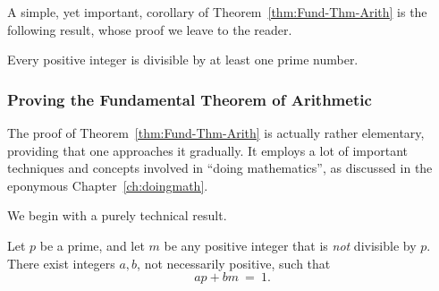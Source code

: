 A simple, yet important, corollary of Theorem~\ref{thm:Fund-Thm-Arith}
is the following result, whose proof we leave to the reader.

\begin{prop}
\label{thm:prime-divisor}
Every positive integer is divisible by at least one prime number.
\end{prop}


\subsubsection{Proving the Fundamental Theorem of Arithmetic}

The  proof of Theorem~\ref{thm:Fund-Thm-Arith} is actually rather
elementary, providing that one approaches it gradually.  It
employs a lot of important techniques and concepts involved in ``doing
mathematics'', as discussed in the eponymous Chapter~\ref{ch:doingmath}.

We begin with a purely technical result.

\begin{prop}
\label{thm:p-n-linear}
Let $p$ be a prime, and let $m$ be any positive integer that is {\em
  not} divisible by $p$.  There exist integers $a, b$, not necessarily
positive, such that
\[ ap + bm \ = \ 1. \]
\end{prop}

